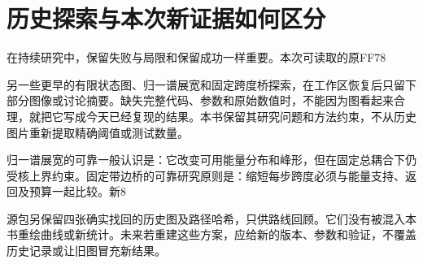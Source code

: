\section{{\cjkfont 历史探索与本次新证据如何区分}\allowbreak{}}\label{sec:53}
{\cjkfont 在持续研究中，保留失败与局限和保留成功一样重要。本次可读取的原}\allowbreak{}FF78\allowbreak{}
\par
{\cjkfont 另一些更早的有限状态图、归一谱展宽和固定跨度桥探索，在工作区恢复后只留下部分图像或讨论摘要。缺失完整代码、参数和原始数值时，不能因为图看起来合理，就把它写成今天已经复现的结果。本书保留其研究问题和方法约束，不从历史图片重新提取精确阈值或测试数量。}\allowbreak{}
\par
{\cjkfont 归一谱展宽的可靠一般认识是：它改变可用能量分布和峰形，但在固定总耦合下仍受核上界约束。固定带边桥的可靠研究原则是：缩短每步跨度必须与能量支持、返回及预算一起比较。新}\allowbreak{}8\allowbreak{}
\par
{\cjkfont 源包另保留四张确实找回的历史图及路径哈希，只供路线回顾。它们没有被混入本书重绘曲线或新统计。未来若重建这些方案，应给新的版本、参数和验证，不覆盖历史记录或让旧图冒充新结果。}\allowbreak{}
\par
{}
\medskip
\FloatBarrier
\Needspace{110pt}
